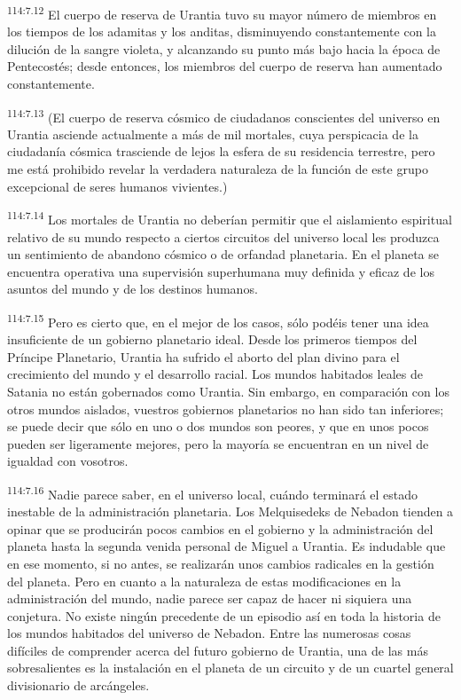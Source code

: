 \documentclass[twoside, 11pt]{book}
\begin{document}
\par
\textsuperscript{114:7.12} El cuerpo de reserva de Urantia tuvo su mayor número de miembros en los tiempos de los adamitas y los anditas, disminuyendo constantemente con la dilución de la sangre violeta, y alcanzando su punto más bajo hacia la época de Pentecostés; desde entonces, los miembros del cuerpo de reserva han aumentado constantemente.

\par
\textsuperscript{114:7.13} (El cuerpo de reserva cósmico de ciudadanos conscientes del universo en Urantia asciende actualmente a más de mil mortales, cuya perspicacia de la ciudadanía cósmica trasciende de lejos la esfera de su residencia terrestre, pero me está prohibido revelar la verdadera naturaleza de la función de este grupo excepcional de seres humanos vivientes.)

\par
\textsuperscript{114:7.14} Los mortales de Urantia no deberían permitir que el aislamiento espiritual relativo de su mundo respecto a ciertos circuitos del universo local les produzca un sentimiento de abandono cósmico o de orfandad planetaria. En el planeta se encuentra operativa una supervisión superhumana muy definida y eficaz de los asuntos del mundo y de los destinos humanos.

\par
\textsuperscript{114:7.15} Pero es cierto que, en el mejor de los casos, sólo podéis tener una idea insuficiente de un gobierno planetario ideal. Desde los primeros tiempos del Príncipe Planetario, Urantia ha sufrido el aborto del plan divino para el crecimiento del mundo y el desarrollo racial. Los mundos habitados leales de Satania no están gobernados como Urantia. Sin embargo, en comparación con los otros mundos aislados, vuestros gobiernos planetarios no han sido tan inferiores; se puede decir que sólo en uno o dos mundos son peores, y que en unos pocos pueden ser ligeramente mejores, pero la mayoría se encuentran en un nivel de igualdad con vosotros.

\par
\textsuperscript{114:7.16} Nadie parece saber, en el universo local, cuándo terminará el estado inestable de la administración planetaria. Los Melquisedeks de Nebadon tienden a opinar que se producirán pocos cambios en el gobierno y la administración del planeta hasta la segunda venida personal de Miguel a Urantia. Es indudable que en ese momento, si no antes, se realizarán unos cambios radicales en la gestión del planeta. Pero en cuanto a la naturaleza de estas modificaciones en la administración del mundo, nadie parece ser capaz de hacer ni siquiera una conjetura. No existe ningún precedente de un episodio así en toda la historia de los mundos habitados del universo de Nebadon. Entre las numerosas cosas difíciles de comprender acerca del futuro gobierno de Urantia, una de las más sobresalientes es la instalación en el planeta de un circuito y de un cuartel general divisionario de arcángeles.
\end{document}

